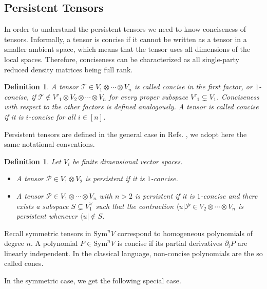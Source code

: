 \documentclass[aps,floatfix,groupedaddress,superscriptaddress,longbibliography,footinbib,notitlepage,showpacs]{revtex4-1}
\newtheorem{definition}[theorem]{Definition}
\begin{document}
\subsection{Persistent Tensors}\label{subsec:persistent}

In order to understand the persistent tensors we need to know conciseness of tensors. Informally, a tensor is concise if it cannot be written as a tensor in a smaller ambient space, which means that the tensor uses all dimensions of the local spaces. Therefore, conciseness can be characterized as all single-party reduced density matrices being full rank.

\begin{definition}\label{def:concise}
A tensor $\mathcal{T}\in V_1\otimes\cdots\otimes V_n$ is called concise in the first factor, or $1$-concise, if $\mathcal{T}\notin V'_1\otimes V_2\otimes\cdots\otimes V_n$ for every proper subspace $V'_1\subsetneq V_1$. Conciseness with respect to the other factors is defined analogously. A tensor is called \emph{concise} if it is $i$-concise for all $i\in [n]$.
\end{definition}

Persistent tensors are defined in the general case in Refs. \cite{Gha,GL24}, we adopt here the same notational conventions.
\begin{definition}\label{def:persistent-tensor}
Let $V_i$ be finite dimensional vector spaces.
\begin{itemize}
\item[(i)] A tensor $\mathcal{P}\in V_1\otimes V_2$ is persistent if it is $1$-concise.
\item[(ii)] A tensor $\mathcal{P}\in V_1\otimes\cdots\otimes V_n$ with $n > 2$ is persistent if it is $1$-concise and there exists a subspace $S \subsetneq V_1^{\vee}$ such that the contraction $\langle u|\mathcal{P}\in V_2\otimes\cdots\otimes V_n$ is persistent whenever $\langle u|\notin S$.
\end{itemize}
\end{definition}

Recall symmetric tensors in $\mathrm{Sym}^nV$ correspond to homogeneous polynomials of degree $n$. A polynomial $P\in\mathrm{Sym}^nV$ is concise if its partial derivatives $\partial_i P$ are linearly independent. In the classical language, non-concise polynomials are the so called cones.

In the symmetric case, we get the following special case.
\end{document}
